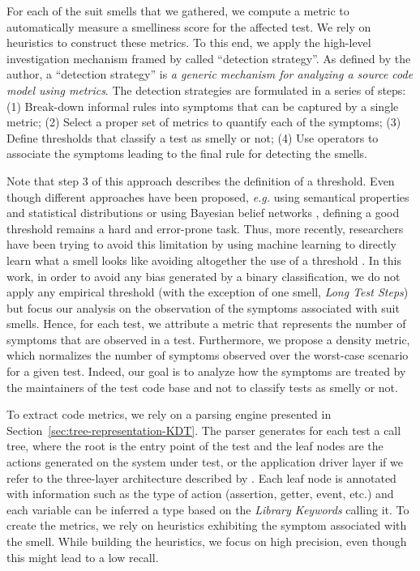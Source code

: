 For each of the \gls{suit} smells that we gathered, we compute a metric to automatically measure a smelliness score for the affected test. We rely on heuristics to construct these metrics. To this end, we apply the high-level investigation mechanism framed by \textcite{Marinescu2004} called ``detection strategy''. As defined by the author, a ``detection strategy'' is \emph{a generic mechanism for analyzing a source code model using metrics}. The detection strategies are formulated in a series of steps: (1) Break-down informal rules into symptoms that can be captured by a single metric; (2) Select a proper set of metrics to quantify each of the symptoms; (3) Define thresholds that classify a test as smelly or not; (4) Use operators to associate the symptoms leading to the final rule for detecting the smells.

Note that step 3 of this approach describes the definition of a threshold. Even though different approaches have been proposed, \emph{e.g.} using semantical properties and statistical distributions \cite{Marinescu2004} or using Bayesian belief networks \cite{Khomh2009}, defining a good threshold remains a hard and error-prone task. Thus, more recently, researchers have been trying to avoid this limitation by using machine learning to directly learn what a smell looks like avoiding altogether the use of a threshold \cite{ArcelliFontana2016}. In this work, in order to avoid any bias generated by a binary classification, we do not apply any empirical threshold (with the exception of one smell, \emph{Long Test Steps}) but focus our analysis on the observation of the symptoms associated with \gls{suit} smells. Hence, for each test, we attribute a metric that represents the number of symptoms that are observed in a test. Furthermore, we propose a density metric, which normalizes the number of symptoms observed over the worst-case scenario for a given test. Indeed, our goal is to analyze how the symptoms are treated by the maintainers of the test code base and not to classify tests as smelly or not.

To extract code metrics, we rely on a parsing engine presented in Section~\ref{sec:tree-representation-KDT}. The parser generates for each test a call tree, where the root is the entry point of the test and the leaf nodes are the actions generated on the system under test, or the application driver layer if we refer to the three-layer architecture described by \textcite{Humble2010}. Each leaf node is annotated with information such as the type of action (assertion, getter, event, etc.) and each variable can be inferred a type based on the \emph{Library Keywords} calling it. To create the metrics, we rely on heuristics exhibiting the symptom associated with the smell. While building the heuristics, we focus on high precision, even though this might lead to a low recall.

